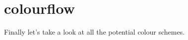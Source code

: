 \chapter{colourflow} 
\label{sec:colourflow}
\lstset{style=6502Style}
Finally let's take a look at all the potential colour schemes.
\clearpage




